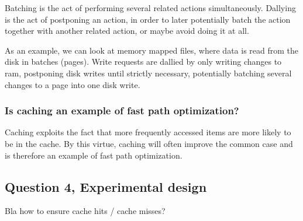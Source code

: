 \documentclass[11pt,a4paper]{article}
\begin{document}
Batching is the act of performing several related actions simultaneously.
Dallying is the act of postponing an action, in order to later potentially batch
the action together with another related action, or maybe avoid doing it at all.

As an example, we can look at memory mapped files, where data is read from the
disk in batches (pages).
Write requests are dallied by only writing changes to ram, postponing disk
writes until strictly necessary, potentially batching several changes to a page
into one disk write.

\subsubsection{Is caching an example of fast path optimization?}

Caching exploits the fact that more frequently accessed items are more likely
to be in the cache. By this virtue, caching will often improve the common case
and is therefore an example of fast path optimization.

\subsection{Question 4, Experimental design}

Bla how to ensure cache hits / cache misses?
\end{document}
